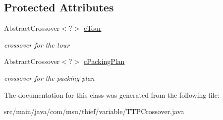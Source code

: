 \subsection*{Protected Attributes}
\begin{DoxyCompactItemize}
\item 
\hypertarget{classcom_1_1msu_1_1thief_1_1variable_1_1TTPCrossover_a392a724cbf3c5e88e2648adcfd17f02f}{Abstract\-Crossover$<$?$>$ \hyperlink{classcom_1_1msu_1_1thief_1_1variable_1_1TTPCrossover_a392a724cbf3c5e88e2648adcfd17f02f}{c\-Tour}}\label{classcom_1_1msu_1_1thief_1_1variable_1_1TTPCrossover_a392a724cbf3c5e88e2648adcfd17f02f}

\begin{DoxyCompactList}\small\item\em crossover for the tour \end{DoxyCompactList}\item 
\hypertarget{classcom_1_1msu_1_1thief_1_1variable_1_1TTPCrossover_a65c9d474482814cdc26a896c3377e160}{Abstract\-Crossover$<$?$>$ \hyperlink{classcom_1_1msu_1_1thief_1_1variable_1_1TTPCrossover_a65c9d474482814cdc26a896c3377e160}{c\-Packing\-Plan}}\label{classcom_1_1msu_1_1thief_1_1variable_1_1TTPCrossover_a65c9d474482814cdc26a896c3377e160}

\begin{DoxyCompactList}\small\item\em crossover for the packing plan \end{DoxyCompactList}\end{DoxyCompactItemize}


The documentation for this class was generated from the following file\-:\begin{DoxyCompactItemize}
\item 
src/main/java/com/msu/thief/variable/T\-T\-P\-Crossover.\-java\end{DoxyCompactItemize}
